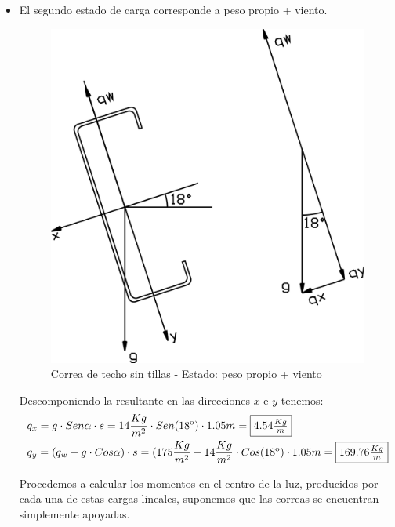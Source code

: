 \begin{enumerate}
\begin{itemize}
\newpage
\item El segundo estado de carga corresponde a peso propio + viento.

\begin{figure}[H]
\begin{center}
     \includegraphics[scale = 1]{chapters/chapter_1/images/figura2.png}
\caption{Correa de techo sin tillas - Estado: peso propio + viento}
\end{center}
\end{figure}

Descomponiendo la resultante en las direcciones $x$ e $y$ tenemos:
\begin{align*}
& q_x=g \cdot Sen \alpha \cdot s = 14 \frac{Kg}{m^2} \cdot Sen(18\textsuperscript{o}) \cdot 1.05m= \framebox{$4.54 \frac{Kg}{m}$}\\
& q_y=(q_w - g \cdot Cos \alpha) \cdot s = (175 \frac{Kg}{m^2} - 14 \frac{Kg}{m^2} \cdot Cos(18\textsuperscript{o}) \cdot 1.05m= \framebox{$169.76 \frac{Kg}{m}$}
\end{align*}

Procedemos a calcular los momentos en el centro de la luz, producidos por cada una de estas cargas lineales, suponemos que las correas se encuentran simplemente apoyadas.


\end{itemize}
\end{enumerate}
